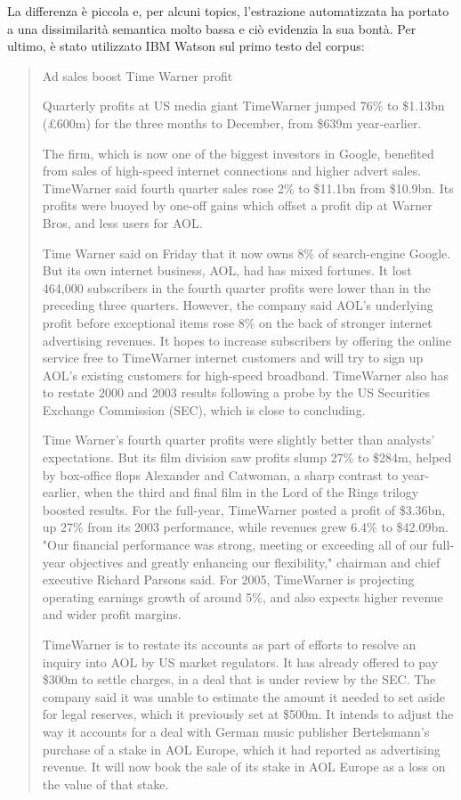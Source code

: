 \documentclass[]{article}
\begin{document}
\newline
La differenza è piccola e, per alcuni topics, l'estrazione automatizzata ha portato a una dissimilarità semantica molto bassa e ciò evidenzia la sua bontà.
\newline
Per ultimo, è stato utilizzato IBM Watson sul primo testo del corpus:
{\footnotesize \blockquote{Ad sales boost Time Warner profit
	
	Quarterly profits at US media giant TimeWarner jumped 76\% to \$1.13bn (£600m) for the three months to December, from \$639m year-earlier.
	
	The firm, which is now one of the biggest investors in Google, benefited from sales of high-speed internet connections and higher advert sales. TimeWarner said fourth quarter sales rose 2\% to \$11.1bn from \$10.9bn. Its profits were buoyed by one-off gains which offset a profit dip at Warner Bros, and less users for AOL.
	
	Time Warner said on Friday that it now owns 8\% of search-engine Google. But its own internet business, AOL, had has mixed fortunes. It lost 464,000 subscribers in the fourth quarter profits were lower than in the preceding three quarters. However, the company said AOL's underlying profit before exceptional items rose 8\% on the back of stronger internet advertising revenues. It hopes to increase subscribers by offering the online service free to TimeWarner internet customers and will try to sign up AOL's existing customers for high-speed broadband. TimeWarner also has to restate 2000 and 2003 results following a probe by the US Securities Exchange Commission (SEC), which is close to concluding.
	
	Time Warner's fourth quarter profits were slightly better than analysts' expectations. But its film division saw profits slump 27\% to \$284m, helped by box-office flops Alexander and Catwoman, a sharp contrast to year-earlier, when the third and final film in the Lord of the Rings trilogy boosted results. For the full-year, TimeWarner posted a profit of \$3.36bn, up 27\% from its 2003 performance, while revenues grew 6.4\% to \$42.09bn. "Our financial performance was strong, meeting or exceeding all of our full-year objectives and greatly enhancing our flexibility," chairman and chief executive Richard Parsons said. For 2005, TimeWarner is projecting operating earnings growth of around 5\%, and also expects higher revenue and wider profit margins.
	
	TimeWarner is to restate its accounts as part of efforts to resolve an inquiry into AOL by US market regulators. It has already offered to pay \$300m to settle charges, in a deal that is under review by the SEC. The company said it was unable to estimate the amount it needed to set aside for legal reserves, which it previously set at \$500m. It intends to adjust the way it accounts for a deal with German music publisher Bertelsmann's purchase of a stake in AOL Europe, which it had reported as advertising revenue. It will now book the sale of its stake in AOL Europe as a loss on the value of that stake.
}}
\end{document}

